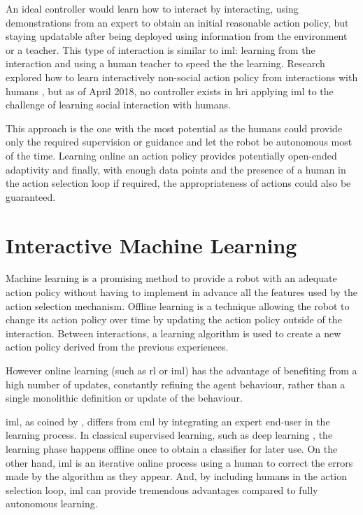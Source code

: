 	An ideal controller would learn how to interact by interacting, using demonstrations from an expert to obtain an initial reasonable action policy, but staying updatable after being deployed using information from the environment or a teacher. This type of interaction is similar to \acrlong{iml}: learning from the interaction and using a human teacher to speed the the learning. Research explored how to learn interactively non-social action policy from interactions with humans \citep{scheutz2017spoken,cakmak2010designing}, but as of April 2018, no controller exists in \gls{hri} applying \gls{iml} to the challenge of learning social interaction with humans. 

	This approach is the one with the most potential as the humans could provide only the required supervision or guidance and let the robot be autonomous most of the time. Learning online an action policy provides potentially open-ended adaptivity and finally, with enough data points and the presence of a human in the action selection loop if required, the appropriateness of actions could also be guaranteed.
	
\section{Interactive Machine Learning} \label{sec:back_iml}

Machine learning is a promising method to provide a robot with an adequate action policy without having to implement in advance all the features used by the action selection mechanism. Offline learning is a technique allowing the robot to change its action policy over time by updating the action policy outside of the interaction. Between interactions, a learning algorithm is used to create a new action policy derived from the previous experiences.

However online learning (such as \gls{rl} or \gls{iml}) has the advantage of benefiting from a high number of updates, constantly refining the agent behaviour, rather than a single monolithic definition or update of the behaviour. 

\acrfull{iml}, as coined by \cite{fails2003interactive}, differs from \acrfull{cml} by integrating an expert end-user in the learning process. In classical supervised learning, such as deep learning \citep{lecun2015deep}, the learning phase happens offline once to obtain a classifier for later use. On the other hand, \acrshort{iml} is an iterative online process using a human to correct the errors made by the algorithm as they appear. And, by including humans in the action selection loop, \gls{iml} can provide tremendous advantages compared to fully autonomous learning.

